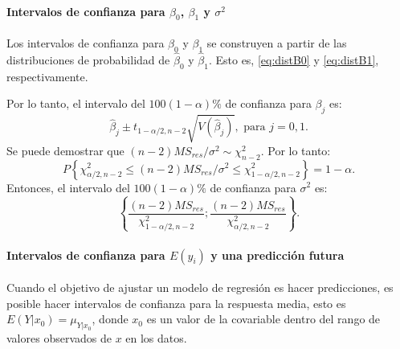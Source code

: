\documentclass[
]{article}
\begin{document}
\hypertarget{intervalos-de-confianza-para-beta_0-beta_1-y-sigma2}{%
\paragraph*{\texorpdfstring{Intervalos de confianza para \(\beta_{0}\), \(\beta_{1}\) y \(\sigma^{2}\)}{Intervalos de confianza para \textbackslash beta\_\{0\}, \textbackslash beta\_\{1\} y \textbackslash sigma\^{}\{2\}}}\label{intervalos-de-confianza-para-beta_0-beta_1-y-sigma2}}

Los intervalos de confianza para \(\beta_{0}\) y \(\beta_{1}\) se construyen a partir de las distribuciones de probabilidad de \(\widehat{\beta}_{0}\) y \(\widehat{\beta}_{1}\). Esto es, \eqref{eq:distB0} y \eqref{eq:distB1}, respectivamente.

Por lo tanto, el intervalo del \(100(1-\alpha)\%\) de confianza para \(\beta_{j}\) es:
\[
\widehat{\beta}_{j} \pm t_{1-\alpha/2,n-2}\sqrt{V(\widehat{\beta}_{j})}, \mbox{ para }j=0,1.
\]
Se puede demostrar que \((n-2)MS_{res}/\sigma^{2}\sim \chi^{2}_{n-2}\). Por lo tanto:
\[
P \left\{ \chi^{2}_{\alpha/2,n-2} \leq (n-2)MS_{res}/\sigma^{2} \leq \chi^{2}_{1-\alpha/2,n-2} \right\} = 1-\alpha.
\]
Entonces, el intervalo del \(100(1-\alpha)\%\) de confianza para \(\sigma^{2}\) es:
\[
\left\{ \frac{(n-2)MS_{res}}{\chi^{2}_{1-\alpha/2,n-2}}; \frac{(n-2)MS_{res}}{\chi^{2}_{\alpha/2,n-2}} \right\}.
\]

\hypertarget{intervalos-de-confianza-para-ey_i-y-una-predicciuxf3n-futura}{%
\paragraph*{\texorpdfstring{Intervalos de confianza para \(E(y_{i})\) y una predicción futura}{Intervalos de confianza para E(y\_\{i\}) y una predicción futura}}\label{intervalos-de-confianza-para-ey_i-y-una-predicciuxf3n-futura}}

Cuando el objetivo de ajustar un modelo de regresión es hacer predicciones, es posible hacer intervalos de confianza para la respuesta media, esto es \(E(Y|x_{0})=\mu_{Y|x_{0}}\), donde \(x_{0}\) es un valor de la covariable dentro del rango de valores observados de \(x\) en los datos.
\end{document}
